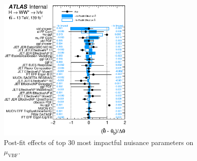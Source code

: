 \begin{figure}[!h]
\centering
      \includegraphics[width=0.6\textwidth]{Pictures/fitresults/impact_data_mu_vbf.eps}
{\caption{Post-fit effects of top 30 most impactful nuisance parameters on $\mu_{\text{VBF}}$.}
\label{fig:impacts}}
\end{figure}

